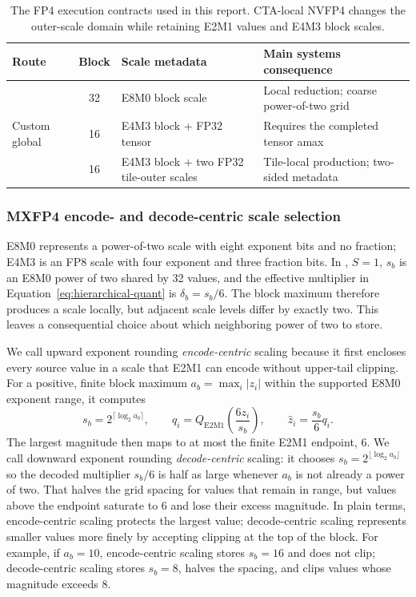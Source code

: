 \begin{table}[htbp]
  \centering
  \caption{The FP4 execution contracts used in this report. CTA-local NVFP4
  changes the outer-scale domain while retaining E2M1 values and E4M3
  block scales.}
  \label{tab:format-contracts}
  \begin{tabularx}{\textwidth}{@{}l c Y Y@{}}
    \toprule
    Route & Block & Scale metadata & Main systems consequence \\
    \midrule
    \mxfp{} & 32 & E8M0 block scale & Local reduction; coarse power-of-two grid \\
    Custom global \nvfp{} & 16 & E4M3 block + FP32 tensor & Requires the completed tensor amax \\
    \localcta{} & 16 & E4M3 block + two FP32 tile-outer scales & Tile-local production; two-sided metadata \\
    \bottomrule
  \end{tabularx}
\end{table}
\FloatBarrier

\subsubsection{MXFP4 encode- and decode-centric scale selection}
\label{sec:mxfp4-scale-direction}

E8M0 represents a power-of-two scale with eight exponent bits and no fraction;
E4M3 is an FP8 scale with four exponent and three fraction bits. In \mxfp{},
$S=1$, $s_b$ is an E8M0 power of two shared by 32 values, and the effective
multiplier in Equation~\ref{eq:hierarchical-quant} is $\delta_b=s_b/6$.
The block maximum therefore produces a scale locally, but adjacent scale
levels differ by exactly two. This leaves a consequential choice about which
neighboring power of two to store.

We call upward exponent rounding \emph{encode-centric} scaling because it
first encloses every source value in a scale that E2M1 can encode without
upper-tail clipping. For a positive, finite block maximum
$a_b=\max_i|z_i|$ within the supported E8M0 exponent range, it computes
\begin{equation}
  s_b=2^{\lceil\log_2 a_b\rceil},\qquad
  q_i=Q_{\mathrm{E2M1}}\!\left(\frac{6z_i}{s_b}\right),\qquad
  \widehat z_i=\frac{s_b}{6}q_i.
  \label{eq:mxfp4-encode-scale}
\end{equation}
The largest magnitude then maps to at most the finite E2M1 endpoint, 6. We
call downward exponent rounding \emph{decode-centric} scaling: it chooses
$s_b=2^{\lfloor\log_2 a_b\rfloor}$ so the decoded multiplier $s_b/6$ is half
as large whenever $a_b$ is not already a power of two. That halves the grid
spacing for values that remain in range, but values above the endpoint
saturate to 6 and lose their excess magnitude. In plain terms,
encode-centric scaling protects the largest value; decode-centric scaling
represents smaller values more finely by accepting clipping at the top of the
block. For example, if $a_b=10$, encode-centric scaling stores $s_b=16$ and
does not clip; decode-centric scaling stores $s_b=8$, halves the spacing, and
clips values whose magnitude exceeds 8.

